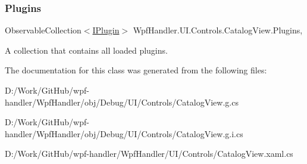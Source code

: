 \subsubsection{\texorpdfstring{Plugins}{Plugins}}
{\footnotesize\ttfamily Observable\+Collection$<$\mbox{\hyperlink{interface_wpf_handler_1_1_plugins_1_1_i_plugin}{I\+Plugin}}$>$ Wpf\+Handler.\+U\+I.\+Controls.\+Catalog\+View.\+Plugins\hspace{0.3cm}{\ttfamily [get]}, {\ttfamily [set]}}



A collection that contains all loaded plugins. 



The documentation for this class was generated from the following files\+:\begin{DoxyCompactItemize}
\item 
D\+:/\+Work/\+Git\+Hub/wpf-\/handler/\+Wpf\+Handler/obj/\+Debug/\+U\+I/\+Controls/Catalog\+View.\+g.\+cs\item 
D\+:/\+Work/\+Git\+Hub/wpf-\/handler/\+Wpf\+Handler/obj/\+Debug/\+U\+I/\+Controls/Catalog\+View.\+g.\+i.\+cs\item 
D\+:/\+Work/\+Git\+Hub/wpf-\/handler/\+Wpf\+Handler/\+U\+I/\+Controls/Catalog\+View.\+xaml.\+cs\end{DoxyCompactItemize}
